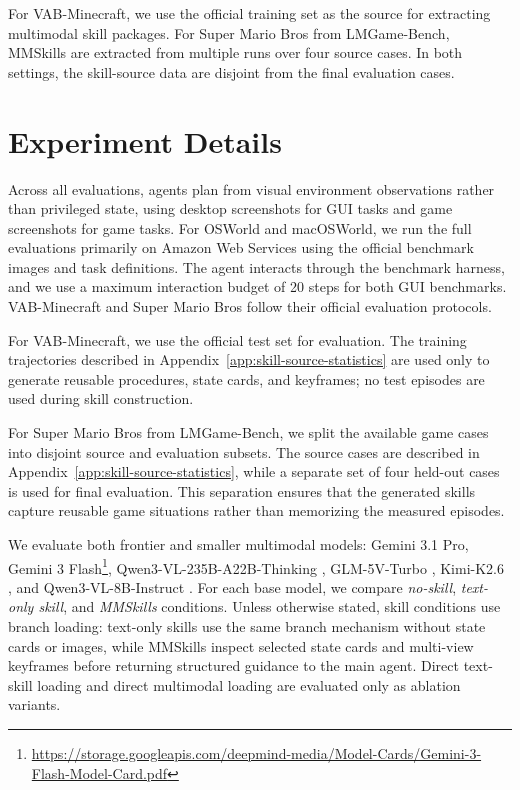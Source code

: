 For VAB-Minecraft, we use the official training set as the source for extracting multimodal skill packages. For Super Mario Bros from LMGame-Bench, MMSkills are extracted from multiple runs over four source cases. In both settings, the skill-source data are disjoint from the final evaluation cases.

\section{Experiment Details}
\label{app:experiment-details}

Across all evaluations, agents plan from visual environment observations rather than privileged state, using desktop screenshots for GUI tasks and game screenshots for game tasks. For OSWorld and macOSWorld, we run the full evaluations primarily on Amazon Web Services using the official benchmark images and task definitions. The agent interacts through the benchmark harness, and we use a maximum interaction budget of 20 steps for both GUI benchmarks. VAB-Minecraft and Super Mario Bros follow their official evaluation protocols.

For VAB-Minecraft, we use the official test set for evaluation. The training trajectories described in Appendix~\ref{app:skill-source-statistics} are used only to generate reusable procedures, state cards, and keyframes; no test episodes are used during skill construction.

For Super Mario Bros from LMGame-Bench, we split the available game cases into disjoint source and evaluation subsets. The source cases are described in Appendix~\ref{app:skill-source-statistics}, while a separate set of four held-out cases is used for final evaluation. This separation ensures that the generated skills capture reusable game situations rather than memorizing the measured episodes.

We evaluate both frontier and smaller multimodal models: Gemini 3.1 Pro, Gemini 3 Flash\footnote{\url{https://storage.googleapis.com/deepmind-media/Model-Cards/Gemini-3-Flash-Model-Card.pdf}}, Qwen3-VL-235B-A22B-Thinking \citep{bai2025qwen3vltechnicalreport}, GLM-5V-Turbo \citep{vteam2026glm5vturbonativefoundationmodel}, Kimi-K2.6 \citep{kimiteam2026kimik25visualagentic}, and Qwen3-VL-8B-Instruct \citep{bai2025qwen3vltechnicalreport}. For each base model, we compare \emph{no-skill}, \emph{text-only skill}, and \emph{MMSkills} conditions. Unless otherwise stated, skill conditions use branch loading: text-only skills use the same branch mechanism without state cards or images, while MMSkills inspect selected state cards and multi-view keyframes before returning structured guidance to the main agent. Direct text-skill loading and direct multimodal loading are evaluated only as ablation variants.

